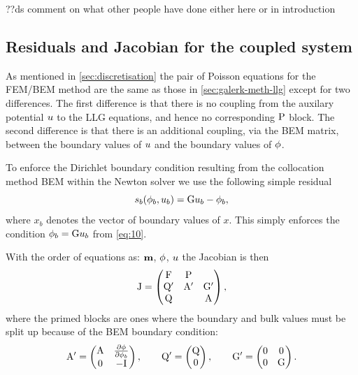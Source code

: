 ??ds comment on what other people have done either here or in introduction


\subsection{Residuals and Jacobian for the coupled system}
\label{sec:bem-jacobian-structure}

As mentioned in \cref{sec:discretisation} the pair of Poisson equations for the FEM/BEM method are the same as those in \cref{sec:galerk-meth-llg} except for two differences.
The first difference is that there is no coupling from the auxilary potential $u$ to the LLG equations, and hence no corresponding $\mathrm{P}$ block.
The second difference is that there is an additional coupling, via the BEM matrix, between the boundary values of $u$ and the boundary values of $\phi$.

To enforce the Dirichlet boundary condition resulting from the collocation method BEM within the Newton solver we use the following simple residual
\newcommand{\rphimb}{\rphi_b}
\begin{equation}
  \rphimb(\phim_b, \phione_b) = \bm \phione_b - \phim_b,
\end{equation}
where $x_b$ denotes the vector of boundary values of $x$.
This simply enforces the condition $\phi_b = {\mathbf{\mathrm{G}}} u_b$ from \cref{eq:10}.

With the order of equations as: $\boldsymbol{\mathrm{m}}$, $\phi$, $u$ the Jacobian is then
\begin{equation}
  \mathrm{J} =
  \begin{pmatrix}
    \mathrm{F}       & \mathrm{P}     &  \\
    \mathrm{Q}'      & \mathrm{A}' &  {\mathbf{\mathrm{G}}}'  \\
    \mathrm{Q}       &         &   \mathrm{A}
  \end{pmatrix},
  \label{eq:16}
\end{equation}
where the primed blocks are ones where the boundary and bulk values must be split up because of the BEM boundary condition:
\begin{equation}
  \mathrm{A}' =
  \begin{pmatrix}
    \mathrm{A}     & \frac{\partial \phi}{\partial \phi_b} \\
    0      & -\mathrm{I}
  \end{pmatrix},
  \qquad
  \mathrm{Q}' =
  \begin{pmatrix}
    \mathrm{Q} \\
    0
  \end{pmatrix},
  \qquad
  {\mathbf{\mathrm{G}}}' =
  \begin{pmatrix}
    0  & 0 \\
    0  & {\mathbf{\mathrm{G}}}
  \end{pmatrix}.
\end{equation}


